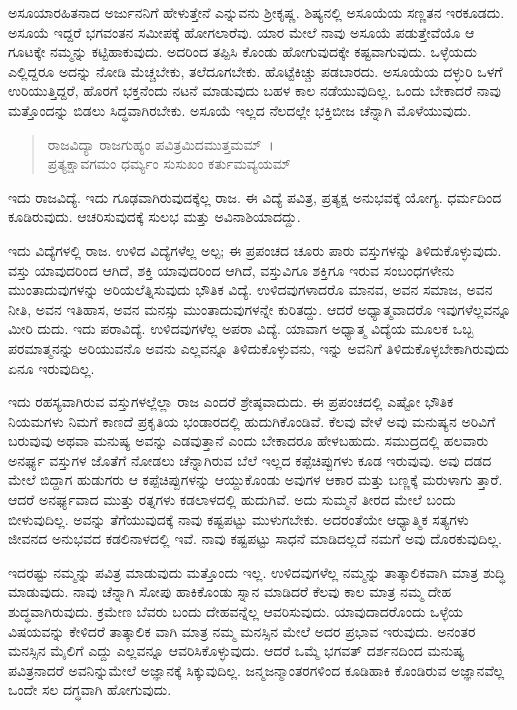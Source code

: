 ಅಸೂಯಾರಹಿತನಾದ ಅರ್ಜುನನಿಗೆ ಹೇಳುತ್ತೇನೆ ಎನ್ನುವನು ಶ‍್ರೀಕೃಷ್ಣ. ಶಿಷ್ಯನಲ್ಲಿ ಅಸೂಯೆಯ ಸಣ್ಣತನ ಇರಕೂಡದು. ಅಸೂಯೆ ಇದ್ದರೆ ಭಗವಂತನ ಸಮೀಪಕ್ಕೆ ಹೋಗಲಾರೆವು. ಯಾರ ಮೇಲೆ ನಾವು ಅಸೂಯೆ ಪಡುತ್ತೇವೆಯೊ ಆ ಗೂಟಕ್ಕೇ ನಮ್ಮನ್ನು ಕಟ್ಟಿಹಾಕುವುದು. ಅದರಿಂದ ತಪ್ಪಿಸಿ ಕೊಂಡು ಹೋಗುವುದಕ್ಕೇ ಕಷ್ಟವಾಗುವುದು. ಒಳ್ಳೆಯದು ಎಲ್ಲಿದ್ದರೂ ಅದನ್ನು ನೋಡಿ ಮೆಚ್ಚಬೇಕು, ತಲೆದೂಗಬೇಕು. ಹೊಟ್ಟೆಕಿಚ್ಚು ಪಡಬಾರದು. ಅಸೂಯೆಯ ದಳ್ಳುರಿ ಒಳಗೆ ಉರಿಯುತ್ತಿದ್ದರೆ, ಹೊರಗೆ ಭಕ್ತನೆಂದು ನಟನೆ ಮಾಡುವುದು ಬಹಳ ಕಾಲ ನಡೆಯುವುದಿಲ್ಲ. ಒಂದು ಬೇಕಾದರೆ ನಾವು ಮತ್ತೊಂದನ್ನು ಬಿಡಲು ಸಿದ್ಧವಾಗಿರಬೇಕು. ಅಸೂಯೆ ಇಲ್ಲದ ನೆಲದಲ್ಲೇ ಭಕ್ತಿಬೀಜ ಚೆನ್ನಾಗಿ ಮೊಳೆಯುವುದು.

\begin{verse}
ರಾಜವಿದ್ಯಾ ರಾಜಗುಹ್ಯಂ ಪವಿತ್ರಮಿದಮುತ್ತಮಮ್~।\\ಪ್ರತ್ಯಕ್ಷಾವಗಮಂ ಧರ್ಮ್ಯಂ ಸುಸುಖಂ ಕರ್ತುಮವ್ಯಯಮ್ 
\end{verse}

{\small ಇದು ರಾಜವಿದ್ಯೆ. ಇದು ಗೂಢವಾಗಿರುವುದಕ್ಕೆಲ್ಲ ರಾಜ. ಈ ವಿದ್ಯೆ ಪವಿತ್ರ, ಪ್ರತ್ಯಕ್ಷ ಅನುಭವಕ್ಕೆ ಯೋಗ್ಯ. ಧರ್ಮದಿಂದ ಕೂಡಿರುವುದು. ಆಚರಿಸುವುದಕ್ಕೆ ಸುಲಭ ಮತ್ತು ಅವಿನಾಶಿಯಾದದ್ದು.}

ಇದು ವಿದ್ಯೆಗಳಲ್ಲಿ ರಾಜ. ಉಳಿದ ವಿದ್ಯೆಗಳೆಲ್ಲ ಅಲ್ಪ; ಈ ಪ್ರಪಂಚದ ಚೂರು ಪಾರು ವಸ್ತುಗಳನ್ನು ತಿಳಿದುಕೊಳ್ಳುವುದು. ವಸ್ತು ಯಾವುದರಿಂದ ಆಗಿದೆ, ಶಕ್ತಿ ಯಾವುದರಿಂದ ಆಗಿದೆ, ವಸ್ತುವಿಗೂ ಶಕ್ತಿಗೂ ಇರುವ ಸಂಬಂಧಗಳೇನು ಮುಂತಾದುವುಗಳನ್ನು ಅರಿಯಲೆತ್ನಿಸುವುದು ಭೌತಿಕ ವಿದ್ಯೆ. ಉಳಿದವುಗಳಾದರೊ ಮಾನವ, ಅವನ ಸಮಾಜ, ಅವನ ನೀತಿ, ಅವನ ಇತಿಹಾಸ, ಅವನ ಮನಸ್ಸು ಮುಂತಾದುವುಗಳನ್ನೇ ಕುರಿತದ್ದು. ಆದರೆ ಅಧ್ಯಾತ್ಮವಾದರೊ ಇವುಗಳೆಲ್ಲವನ್ನೂ ಮೀರಿ ದುದು. ಇದು ಪರಾವಿದ್ಯೆ. ಉಳಿದವುಗಳೆಲ್ಲ ಅಪರಾ ವಿದ್ಯೆ. ಯಾವಾಗ ಅಧ್ಯಾತ್ಮ ವಿದ್ಯೆಯ ಮೂಲಕ ಒಬ್ಬ ಪರಮಾತ್ಮನನ್ನು ಅರಿಯುವನೊ ಅವನು ಎಲ್ಲವನ್ನೂ ತಿಳಿದುಕೊಳ್ಳುವನು, ಇನ್ನು ಅವನಿಗೆ ತಿಳಿದುಕೊಳ್ಳಬೇಕಾಗಿರುವುದು ಏನೂ ಇರುವುದಿಲ್ಲ.

ಇದು ರಹಸ್ಯವಾಗಿರುವ ವಸ್ತುಗಳಲ್ಲೆಲ್ಲಾ ರಾಜ ಎಂದರೆ ಶ್ರೇಷ್ಠವಾದುದು. ಈ ಪ್ರಪಂಚದಲ್ಲಿ ಎಷ್ಟೋ ಭೌತಿಕ ನಿಯಮಗಳು ನಿಮಗೆ ಕಾಣದೆ ಪ್ರಕೃತಿಯ ಭಂಡಾರದಲ್ಲಿ ಹುದುಗಿಕೊಂಡಿವೆ. ಕೆಲವು ವೇಳೆ ಅವು ಮನುಷ್ಯನ ಅರಿವಿಗೆ ಬರುವುವು ಅಥವಾ ಮನುಷ್ಯ ಅವನ್ನು ಎಡವುತ್ತಾನೆ ಎಂದು ಬೇಕಾದರೂ ಹೇಳಬಹುದು. ಸಮುದ್ರದಲ್ಲಿ ಹಲವಾರು ಅನರ್ಘ್ಯ ವಸ್ತುಗಳ ಜೊತೆಗೆ ನೋಡಲು ಚೆನ್ನಾಗಿರುವ ಬೆಲೆ ಇಲ್ಲದ ಕಪ್ಪೆಚಿಪ್ಪುಗಳು ಕೂಡ ಇರುವುವು. ಅವು ದಡದ ಮೇಲೆ ಬಿದ್ದಾಗ ಹುಡುಗರು ಆ ಕಪ್ಪೆಚಿಪ್ಪುಗಳನ್ನು ಆಯ್ದುಕೊಂಡು ಅವುಗಳ ಆಕಾರ ಮತ್ತು ಬಣ್ಣಕ್ಕೆ ಮರುಳಾಗು ತ್ತಾರೆ. ಆದರೆ ಅನರ್ಘ್ಯವಾದ ಮುತ್ತು ರತ್ನಗಳು ಕಡಲಾಳದಲ್ಲಿ ಹುದುಗಿವೆ. ಅದು ಸುಮ್ಮನೆ ತೀರದ ಮೇಲೆ ಬಂದು ಬೀಳುವುದಿಲ್ಲ. ಅವನ್ನು ತೆಗೆಯುವುದಕ್ಕೆ ನಾವು ಕಷ್ಟಪಟ್ಟು ಮುಳುಗಬೇಕು. ಅದರಂತೆಯೇ ಆಧ್ಯಾತ್ಮಿಕ ಸತ್ಯಗಳು ಜೀವನದ ಅನುಭವದ ಕಡಲಿನಾಳದಲ್ಲಿ ಇವೆ. ನಾವು ಕಷ್ಟಪಟ್ಟು ಸಾಧನೆ ಮಾಡಿದಲ್ಲದೆ ನಮಗೆ ಅವು ದೊರಕುವುದಿಲ್ಲ.

ಇದರಷ್ಟು ನಮ್ಮನ್ನು ಪವಿತ್ರ ಮಾಡುವುದು ಮತ್ತೊಂದು ಇಲ್ಲ. ಉಳಿದವುಗಳೆಲ್ಲ ನಮ್ಮನ್ನು ತಾತ್ಕಾಲಿಕವಾಗಿ ಮಾತ್ರ ಶುದ್ಧಿ ಮಾಡುವುದು. ನಾವು ಚೆನ್ನಾಗಿ ಸೋಪು ಹಾಕಿಕೊಂಡು ಸ್ನಾನ ಮಾಡಿದರೆ ಕೆಲವು ಕಾಲ ಮಾತ್ರ ನಮ್ಮ ದೇಹ ಶುದ್ಧವಾಗಿರುವುದು. ಕ್ರಮೇಣ ಬೆವರು ಬಂದು ದೇಹವನ್ನೆಲ್ಲ ಆವರಿಸುವುದು. ಯಾವುದಾದರೊಂದು ಒಳ್ಳೆಯ ವಿಷಯವನ್ನು ಕೇಳಿದರೆ ತಾತ್ಕಾಲಿಕ ವಾಗಿ ಮಾತ್ರ ನಮ್ಮ ಮನಸ್ಸಿನ ಮೇಲೆ ಅದರ ಪ್ರಭಾವ ಇರುವುದು. ಅನಂತರ ಮನಸ್ಸಿನ ಮೈಲಿಗೆ ಎದ್ದು ಎಲ್ಲವನ್ನೂ ಆವರಿಸಿಕೊಳ್ಳುವುದು. ಆದರೆ ಒಮ್ಮೆ ಭಗವತ್ ದರ್ಶನದಿಂದ ಮನುಷ್ಯ ಪವಿತ್ರನಾದರೆ ಅವನಿನ್ನುಮೇಲೆ ಅಜ್ಞಾನಕ್ಕೆ ಸಿಕ್ಕುವುದಿಲ್ಲ. ಜನ್ಮಜನ್ಮಾಂತರಗಳಿಂದ ಕೂಡಿಹಾಕಿ ಕೊಂಡಿರುವ ಅಜ್ಞಾನವೆಲ್ಲ ಒಂದೇ ಸಲ ದಗ್ಧವಾಗಿ ಹೋಗುವುದು.

